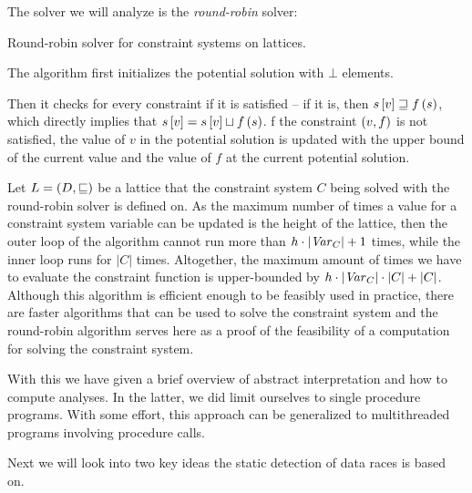 \documentclass[..thesis.tex]{subfiles}
\begin{document}
The solver we will analyze is the \textit{round-robin} solver:


\begin{algorithm}[H]
\label{round-robin}
\caption{Round-robin solver for constraint systems on lattices.}
\end{algorithm}
The algorithm first initializes the potential solution with $\bot$ elements.

Then it checks for every constraint if it is satisfied -- if it is, then $s \left[ v \right] \sqsupseteq f \left( s \right)$,
which directly implies that $s \left[ v \right] = s \left[ v \right] \sqcup f \left( s \right)$. 
f the constraint $\left( v, f \right)$  is not satisfied, the value of $v$ in the potential solution is updated with the upper bound of the current
value and the value of $f$ at the current potential solution.

Let $L = \left( D, \sqsubseteq \right)$ be a lattice that the constraint system $C$ being solved with the round-robin solver is defined on.
As the maximum number of times a value for a constraint system variable can be updated is the height of the lattice,
then the outer loop of the algorithm cannot run more than $h \cdot \left| \mathit{Var}_C \right| + 1$ times, while the inner loop runs for $\left| C \right|$ times.
Altogether, the maximum amount of times we have to evaluate the constraint function is upper-bounded by $h \cdot \left| \mathit{Var}_C \right| \cdot \left| C \right| + \left| C \right|$.
Although this algorithm is efficient enough to be feasibly used in practice,
there are faster algorithms that can be used to solve the constraint system and
the round-robin algorithm serves here as a proof of the feasibility of a computation for solving the constraint system.

With this we have given a brief overview of abstract interpretation and how to compute analyses. In the latter,
we did limit ourselves to single procedure programs. With some effort, this approach can be generalized to multithreaded programs involving procedure calls.

Next we will look into two key ideas the static detection of data races is based on.
\end{document}
